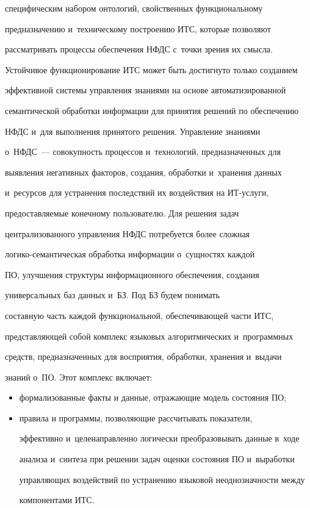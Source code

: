 специфическим набором онтологий, свойственных функциональному


предназначению и~техническому построению ИТС, которые позволяют


рассматривать процессы обеспечения НФДС с~точки зрения их смысла.


Устойчивое функционирование ИТС может быть достигнуто только созданием


эффективной системы управления знаниями на основе автоматизированной


семантической обработки информации для принятия решений по обеспечению


НФДС и~для выполнения принятого решения. Управление знаниями


о~НФДС~--- совокупность процессов и~технологий, предназначенных для


выявления негативных факторов, создания, обработки и~хранения данных


и~ресурсов для устранения последствий их воздействия на ИТ-услу\-ги,


предоставляемые конечному пользователю. Для решения задач


централизованного управления НФДС потребуется более сложная


  ло\-ги\-ко-се\-ман\-ти\-че\-ская обработка информации о~сущностях каждой


ПО, улучшения структуры информационного обеспечения, создания


универсальных баз данных и~БЗ. Под БЗ будем понимать


составную часть каждой функциональной, обеспечивающей части ИТС,


представляющей собой комплекс языковых алгоритмических и~программных


средств, предназначенных для восприятия, обработки, хранения и~выдачи


знаний о~ПО. Этот комплекс включает:


  \begin{itemize}


  \item формализованные факты и данные, отражающие модель состояния ПО;


  \item правила и программы, позволяющие рассчитывать показатели,


эффективно и~целенаправленно логически преобразовывать данные в~ходе


анализа и~синтеза при решении задач оценки состояния ПО и~выработки


управляющих воздействий по устранению языковой неоднозначности между


компонентами ИТС.


  \end{itemize}






